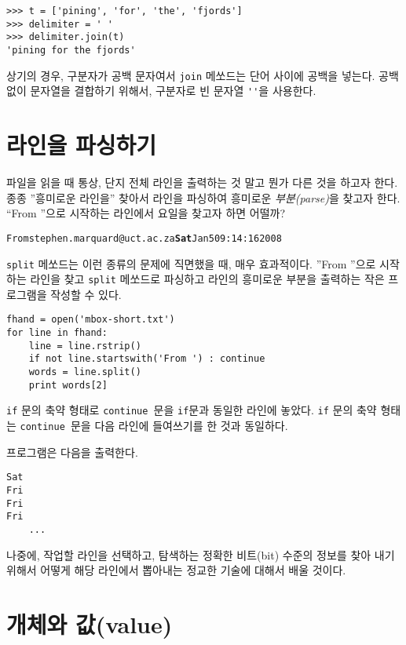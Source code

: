 \beforeverb
\begin{verbatim}
>>> t = ['pining', 'for', 'the', 'fjords']
>>> delimiter = ' '
>>> delimiter.join(t)
'pining for the fjords'
\end{verbatim}
\afterverb
%

상기의 경우, 구분자가 공백 문자여서 {\tt join} 메쏘드는 단어 사이에 공백을 넣는다.
공백없이 문자열을 결합하기 위해서, 구분자로 빈 문자열 \verb"''"을 사용한다.



\section{라인을 파싱하기}

파일을 읽을 때 통상, 단지 전체 라인을 출력하는 것 말고 뭔가 다른 것을 하고자 한다.
종종 ''흥미로운 라인을'' 찾아서 라인을 파싱하여 흥미로운 \emph{ 부분(parse)}을 찾고자 한다.
``From ''으로 시작하는 라인에서 요일을 찾고자 하면 어떨까?

\beforeverb
\begin{alltt}
From stephen.marquard@uct.ac.za {\bf Sat} Jan  5 09:14:16 2008
\end{alltt}
\afterverb

{\tt split} 메쏘드는 이런 종류의 문제에 직면했을 때, 매우 효과적이다.
''From ''으로 시작하는 라인을 찾고 {\tt split} 메쏘드로 파싱하고 라인의 흥미로운 부분을 출력하는 작은 프로그램을 작성할 수 있다.

\beforeverb
\begin{verbatim}
fhand = open('mbox-short.txt')
for line in fhand:
    line = line.rstrip()
    if not line.startswith('From ') : continue
    words = line.split()
    print words[2]
\end{verbatim}
\afterverb
%

{\tt if} 문의 축약 형태로 {\tt continue }문을 {\tt if}문과 동일한 라인에 놓았다.
{\tt if} 문의 축약 형태는 {\tt continue }문을 다음 라인에 들여쓰기를 한 것과 동일하다.

프로그램은 다음을 출력한다.

\beforeverb
\begin{verbatim}
Sat
Fri
Fri
Fri
    ...
\end{verbatim}
\afterverb
%

나중에, 작업할 라인을 선택하고, 탐색하는 정확한 비트(bit) 수준의 정보를 찾아 내기 위해서 어떻게 해당 라인에서 뽑아내는 정교한 기술에 대해서 배울 것이다.

\section{개체와 값(value)}

